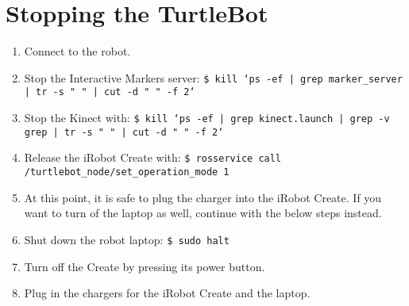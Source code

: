 \documentclass[12pt]{report}
\begin{document}
\section{Stopping the TurtleBot}
\begin{sloppypar}
\begin{enumerate}
\item{Connect to the robot.}
\item{Stop the Interactive Markers server: \texttt{\$\ kill `ps -ef | grep marker\_server | tr -s " " | cut -d " " -f 2`}}
\item{Stop the Kinect with: \texttt{\$\ kill `ps -ef | grep kinect.launch | grep -v grep | tr -s " " | cut -d " " -f 2`}}
\item{Release the iRobot Create with: \texttt{\$\ rosservice call /turtlebot\_node/set\_operation\_mode 1}}
\item{At this point, it is safe to plug the charger into the iRobot Create.  If you want to turn of the laptop as well, continue with the below steps instead.}
\item{Shut down the robot laptop: \texttt{\$\ sudo halt}}
\item{Turn off the Create by pressing its power button.}
\item{Plug in the chargers for the iRobot Create and the laptop.}
\end{enumerate}
\end{sloppypar}
\end{document}
